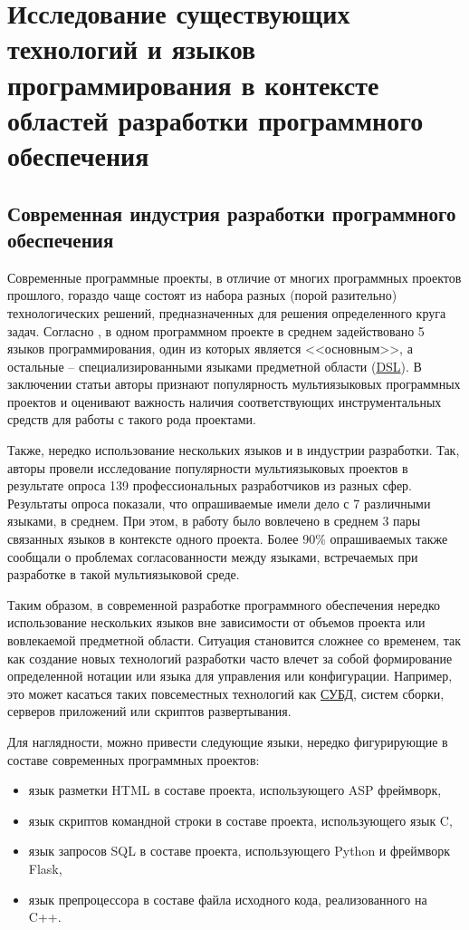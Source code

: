 \section{Исследование существующих технологий и языков программирования в контексте
областей разработки программного обеспечения} \label{sec:num1}

\subsection{Современная индустрия разработки программного обеспечения}

Современные программные проекты, в отличие от многих программных проектов прошлого,
гораздо чаще состоят из набора разных (порой разительно) технологических
решений, предназначенных для решения определенного круга задач. Согласно \cite{empirical-analysis},
в одном программном проекте в среднем задействовано 5 языков программирования, один из
которых является <<основным>>, а остальные -- специализированными языками предметной области (\hyperlink{DSL}{DSL}).
В заключении статьи авторы признают популярность мультиязыковых программных проектов
и оценивают важность наличия соответствующих инструментальных средств для работы с
такого рода проектами.

Также, нередко использование нескольких языков и в индустрии разработки. Так, авторы \cite{professional-developers}
провели исследование популярности мультиязыковых проектов
в результате опроса 139 профессиональных разработчиков из разных сфер. 
Результаты опроса показали, что опрашиваемые имели дело с 7 различными языками, в среднем.
При этом, в работу было вовлечено в среднем 3 пары связанных языков в контексте одного проекта.
Более 90\% опрашиваемых также сообщали о проблемах согласованности между языками,
встречаемых при разработке в такой мультиязыковой среде. 

Таким образом, в современной разработке программного обеспечения нередко использование
нескольких языков вне зависимости от объемов проекта или вовлекаемой предметной области.
Ситуация становится сложнее со временем, так как создание новых технологий разработки
часто влечет за собой формирование определенной нотации или языка для управления или конфигурации.
Например, это может касаться таких повсеместных технологий как \hyperlink{СУБД}{СУБД}, систем сборки,
серверов приложений или скриптов развертывания.

Для наглядности, можно привести следующие языки, нередко фигурирующие в составе современных программных проектов:
\begin{itemize}    
    \item язык разметки HTML в составе проекта, использующего ASP фреймворк,
    \item язык скриптов командной строки в составе проекта, использующего язык C,
    \item язык запросов SQL в составе проекта, использующего Python и фреймворк Flask,
    \item язык препроцессора в составе файла исходного кода, реализованного на C++.
\end{itemize}


